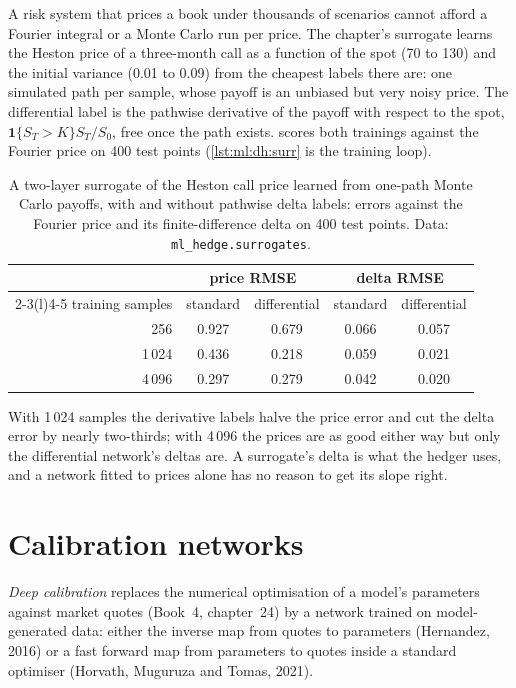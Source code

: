 A risk system that prices a book under thousands of scenarios cannot afford a Fourier integral or a Monte Carlo run per
price. The chapter's surrogate learns the Heston price of a three-month call as a function of the spot (70 to 130) and the
initial variance (0.01 to 0.09) from the cheapest labels there are: one simulated path per sample, whose payoff is an unbiased
but very noisy price. The differential label is the pathwise derivative of the payoff with respect to the spot,
$\mathbf1\{S_T > K\}S_T/S_0$, free once the path exists.  scores both trainings against the Fourier price
on 400 test points (\cref{lst:ml:dh:surr} is the training loop).

\begin{table}[htbp]
\centering\small
\begin{tabular}{@{}rcccc@{}}
\toprule
& \multicolumn{2}{c}{price RMSE} & \multicolumn{2}{c}{delta RMSE}\\
\cmidrule(lr){2-3}\cmidrule(l){4-5}
training samples & standard & differential & standard & differential\\
\midrule
256 & 0.927 & 0.679 & 0.066 & 0.057\\
1\,024 & 0.436 & 0.218 & 0.059 & 0.021\\
4\,096 & 0.297 & 0.279 & 0.042 & 0.020\\
\bottomrule
\end{tabular}
\caption{A two-layer surrogate of the Heston call price learned from one-path Monte Carlo payoffs, with and without pathwise
delta labels: errors against the Fourier price and its finite-difference delta on 400 test points. Data:
\texttt{ml\_hedge.surrogates}.}\label{tab:ml:dh:surr}
\end{table}

With 1\,024 samples the derivative labels halve the price error and cut the delta error by nearly two-thirds; with 4\,096 the
prices are as good either way but only the differential network's deltas are. A surrogate's delta is what the hedger uses, and
a network fitted to prices alone has no reason to get its slope right.

\section{Calibration networks}

\begin{definition}\label{def:ml:deep-hedging-and-machine-learning-in-pricing:calib}
\emph{Deep calibration} replaces the numerical optimisation of a model's parameters against market quotes
(Book~4, chapter~24) by a network trained on model-generated data: either the inverse map from quotes to parameters (Hernandez,
2016) or a fast forward map from parameters to quotes inside a standard optimiser (Horvath, Muguruza and Tomas, 2021).
\end{definition}

